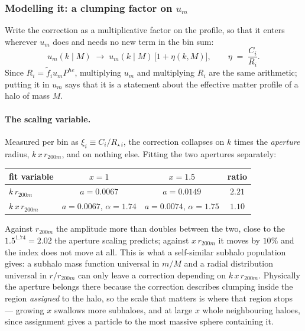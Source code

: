 \documentclass{article}
\begin{document}
\subsubsection{Modelling it: a clumping factor on $u_m$}
\label{sec:clumping}

Write the correction as a multiplicative factor on the profile, so that it
enters wherever $u_m$ does and needs no new term in the bin sum:
\begin{equation}
  u_m(k\mid M) \;\longrightarrow\; u_m(k\mid M)\,\big[1+\eta(k,M)\big],
  \qquad \eta \;=\; \frac{C_i}{R_i} .
  \label{eq:clump-apply}
\end{equation}
Since $R_i = \tilde f_i u_m P^{he}$, multiplying $u_m$ and multiplying $R_i$
are the same arithmetic; putting it in $u_m$ says that it is a statement about
the effective matter profile of a halo of mass $M$.

\paragraph{The scaling variable.} Measured per bin as $\xi_i \equiv
C_i/R_{\star\,i}$, the correction collapses on $k$ times the \emph{aperture}
radius, $k\,x\,r_{200m}$, and on nothing else. Fitting the two apertures
separately:
\begin{center}
\renewcommand{\arraystretch}{1.2}
\begin{tabular}{lccc}
\hline
fit variable & $x=1$ & $x=1.5$ & ratio \\
\hline
$k\,r_{200m}$   & $a = 0.0067$ & $a = 0.0149$ & $2.21$ \\
$k\,x\,r_{200m}$ & $a = 0.0067$, $\alpha = 1.74$ & $a = 0.0074$, $\alpha = 1.75$ & $1.10$ \\
\hline
\end{tabular}
\end{center}
Against $r_{200m}$ the amplitude more than doubles between the two, close to
the $1.5^{1.74} = 2.02$ the aperture scaling predicts; against $x\,r_{200m}$ it
moves by $10\%$ and the index does not move at all. This is what a
self-similar subhalo population gives: a subhalo mass function universal in
$m/M$ and a radial distribution universal in $r/r_{200m}$ can only leave a
correction depending on $k\,x\,r_{200m}$. Physically the aperture belongs there
because the correction describes clumping inside the region \emph{assigned} to
the halo, so the scale that matters is where that region stops --- growing $x$
swallows more subhaloes, and at large $x$ whole neighbouring haloes, since
assignment gives a particle to the most massive sphere containing it.
\end{document}
